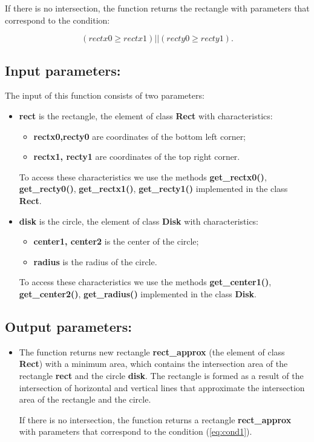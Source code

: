 \documentclass{report}
\begin{document}
If there is no intersection, the function returns the rectangle with parameters that correspond to the condition: 

\begin{equation}
	(rectx0 \ge rectx1) || (recty0 \ge recty1).
	\label{eq:cond1}
\end{equation}

\subsection*{Input parameters:}

The input of this function consists of two parameters:

\begin{itemize}
	\item {\bfseries	rect} is the rectangle, the element of class {\bfseries Rect} with characteristics:
	\begin{itemize}
		\item {\bfseries rectx0,recty0} are coordinates of the bottom left corner;
		\item {\bfseries rectx1, recty1} are coordinates of the top right corner.
	\end{itemize}
	
	To access these characteristics we use the methods  {\bfseries get\_rectx0()}, {\bfseries get\_recty0()}, {\bfseries get\_rectx1()}, {\bfseries get\_recty1()} implemented in the class {\bfseries Rect}.
	
	\item {\bfseries disk}  is the circle, the element of class {\bfseries Disk} with characteristics:
	\begin{itemize}
		\item {\bfseries center1, center2}  is the center of the circle;
		\item {\bfseries radius}  is  the radius of the circle.
	\end{itemize}
	
	To access these characteristics we use the methods {\bfseries get\_center1()}, {\bfseries get\_center2()}, {\bfseries get\_radius()} implemented in the class {\bfseries Disk}.
\end{itemize}

\subsection*{Output parameters:}

\begin{itemize}
	\item The function returns new rectangle {\bfseries rect\_approx} (the element of class {\bfseries Rect}) with a minimum area, which contains the intersection area of the rectangle {\bfseries rect} and the circle {\bfseries disk}. The rectangle is formed as a result of the intersection of horizontal and vertical lines that approximate the intersection area of the rectangle and the circle.
	
	If there is no intersection, the function returns a rectangle {\bfseries rect\_approx} with parameters that correspond to the condition (\ref{eq:cond1}).
	
\end{itemize}
\end{document}
